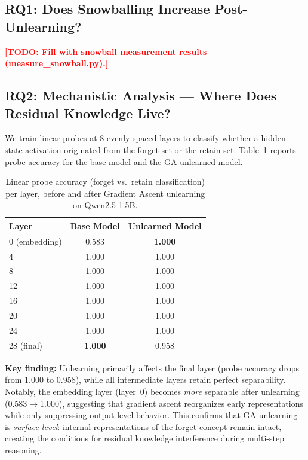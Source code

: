 \documentclass[letterpaper]{article}
\newcommand{\TODO}[1]{\textcolor{red}{\textbf{[TODO: #1]}}}
\begin{document}
\subsection{RQ1: Does Snowballing Increase Post-Unlearning?}
\TODO{Fill with snowball measurement results (measure\_snowball.py).}

\subsection{RQ2: Mechanistic Analysis --- Where Does Residual Knowledge Live?}

We train linear probes at 8 evenly-spaced layers to classify whether a hidden-state
activation originated from the forget set or the retain set. Table~\ref{tab:rki}
reports probe accuracy for the base model and the GA-unlearned model.

\begin{table}[h]
\centering
\caption{Linear probe accuracy (forget vs.\ retain classification) per layer,
before and after Gradient Ascent unlearning on Qwen2.5-1.5B.}
\label{tab:rki}
\begin{tabular}{lcc}
\toprule
Layer & Base Model & Unlearned Model \\
\midrule
0  (embedding)  & 0.583 & \textbf{1.000} \\
4               & 1.000 & 1.000 \\
8               & 1.000 & 1.000 \\
12              & 1.000 & 1.000 \\
16              & 1.000 & 1.000 \\
20              & 1.000 & 1.000 \\
24              & 1.000 & 1.000 \\
28 (final)      & \textbf{1.000} & 0.958 \\
\bottomrule
\end{tabular}
\end{table}

\textbf{Key finding:} Unlearning primarily affects the final layer (probe accuracy
drops from 1.000 to 0.958), while all intermediate layers retain perfect separability.
Notably, the embedding layer (layer~0) becomes \emph{more} separable after unlearning
(0.583$\to$1.000), suggesting that gradient ascent reorganizes early representations
while only suppressing output-level behavior. This confirms that GA unlearning is
\textit{surface-level}: internal representations of the forget concept remain intact,
creating the conditions for residual knowledge interference during multi-step reasoning.
\end{document}
